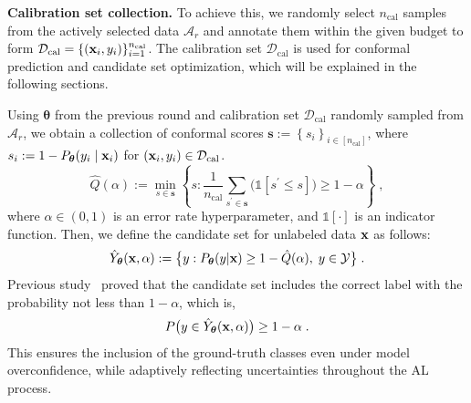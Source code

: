 \noindent\textbf{Calibration set collection.} \label{sec:calib}
To achieve this, we randomly select $n_\text{cal}$ samples from the actively selected data $\mathcal{A}_r$ and annotate them within the given budget to form $\mathcal{D}_{\text{cal}} = \{(\mathbf{x}_i, y_i)\}_{i=1}^{n_\text{cal}}$.
The calibration set $\mathcal{D}_\text{cal}$ is used for conformal prediction and candidate set optimization, which will be explained in the following sections.

\noindent\textbf{}
Using $\boldsymbol{\theta}$ from the previous round and calibration set $\mathcal{D}_\text{cal}$ randomly sampled from $\mathcal{A}_r$,
we obtain a collection of conformal scores $\mathbf s := \left\{s_i \right\}_{i\in[n_\text{cal}]}$, where $s_i : = 1 - P_{\boldsymbol{\theta}}(y_i \mid \mathbf{x}_i)$ for $(\mathbf{x}_i,y_i) \in \mathcal{D}_\text{cal}$.
\begin{equation}
        \hat{Q}(\alpha) := \min_{s \in \mathbf s}\left\{ s: \frac{1}{n_\text{cal}} \sum_{s^\prime \in \mathbf s } \big (\mathds{1}[s^\prime \leq s] \big ) \geq 1-\alpha \right\} \;,
        \label{eq:quantile}
\end{equation}
where $\alpha \in (0,1)$ is an error rate hyperparameter, and $\mathds{1}[\cdot]$ is an indicator function.
Then, we define the candidate set for unlabeled data $\mathbf{x}$ as follows:
\begin{equation}
        \hat{Y}_{\boldsymbol{\theta}}(\mathbf{x}, \alpha) := \big\{y: P_{\boldsymbol{\theta}}(y|\mathbf{x}) \geq 1 - \hat{Q}(\alpha),\; y \in \mathcal{Y}\big\}\;.
        \label{eq:candidate}
\end{equation}
Previous study~\citep{vovk1999machine, angelopoulos-gentle} proved that the candidate set includes the correct label with the probability not less than $1-\alpha$, which is,
\begin{equation}
    \label{eq:conf}
    P\big(y \in \hat{Y}_{\boldsymbol{\theta}}(\mathbf{x}, \alpha)\big) \geq 1-\alpha \;.
\end{equation}
This ensures the inclusion of the ground-truth classes even under model overconfidence, while adaptively reflecting uncertainties throughout the AL process.

